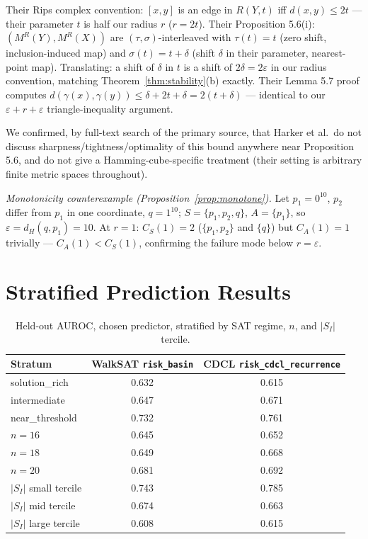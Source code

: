\documentclass[11pt]{article}
\theoremstyle{definition}
\theoremstyle{remark}
\newcommand{\Shat}{S_I}
\newcommand{\dH}{d_H}
\begin{document}
Their Rips complex convention: $[x,y]$ is an edge in $R(Y,t)$ iff $d(x,y) \le 2t$ --- their parameter $t$ is half our radius $r$ ($r = 2t$). Their Proposition 5.6(i): $(M^R(Y), M^R(X))$ are $(\tau,\sigma)$-interleaved with $\tau(t)=t$ (zero shift, inclusion-induced map) and $\sigma(t) = t+\delta$ (shift $\delta$ in their parameter, nearest-point map). Translating: a shift of $\delta$ in $t$ is a shift of $2\delta = 2\varepsilon$ in our radius convention, matching Theorem~\ref{thm:stability}(b) exactly. Their Lemma 5.7 proof computes $d(\gamma(x),\gamma(y)) \le \delta + 2t + \delta = 2(t+\delta)$ --- identical to our $\varepsilon+r+\varepsilon$ triangle-inequality argument.

We confirmed, by full-text search of the primary source, that Harker et al.\ do not discuss sharpness/tightness/optimality of this bound anywhere near Proposition 5.6, and do not give a Hamming-cube-specific treatment (their setting is arbitrary finite metric spaces throughout).

\emph{Monotonicity counterexample (Proposition~\ref{prop:monotone}).} Let $p_1 = 0^{10}$, $p_2$ differ from $p_1$ in one coordinate, $q=1^{10}$; $S=\{p_1,p_2,q\}$, $A=\{p_1\}$, so $\varepsilon = \dH(q,p_1) = 10$. At $r=1$: $C_S(1)=2$ ($\{p_1,p_2\}$ and $\{q\}$) but $C_A(1)=1$ trivially --- $C_A(1) < C_S(1)$, confirming the failure mode below $r=\varepsilon$.

\section{Stratified Prediction Results}
\label{app:stratification}

\begin{table}[htbp]
\centering
\caption{Held-out AUROC, chosen predictor, stratified by SAT regime, $n$, and $|\Shat|$ tercile.}
\begin{tabular}{@{}lcc@{}}
\toprule
Stratum & WalkSAT \texttt{risk\_basin} & CDCL \texttt{risk\_cdcl\_recurrence} \\
\midrule
solution\_rich & 0.632 & 0.615 \\
intermediate & 0.647 & 0.671 \\
near\_threshold & 0.732 & 0.761 \\
$n=16$ & 0.645 & 0.652 \\
$n=18$ & 0.649 & 0.668 \\
$n=20$ & 0.681 & 0.692 \\
$|\Shat|$ small tercile & 0.743 & 0.785 \\
$|\Shat|$ mid tercile & 0.674 & 0.663 \\
$|\Shat|$ large tercile & 0.608 & 0.615 \\
\bottomrule
\end{tabular}
\end{table}
\end{document}
